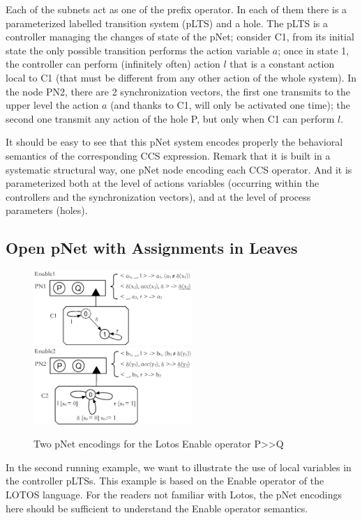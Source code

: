 \documentclass{lncs/llncs}
\begin{document}
  Each of the subnets act as one of the prefix operator.
In each of them there is a parameterized labelled transition system
(pLTS) and a hole. The pLTS is a controller managing the
changes of state of the pNet; consider C1, from its initial state the
only possible transition performs the action variable $a$; once in
state 1, the controller can perform (infinitely often) action $l$ that
is a constant action local to C1 (that must be different from any
other action of the whole system). In the node PN2, there are 2
synchronization vectors, the first one transmits to the upper level the
action $a$ (and thanks to C1, will only be activated one time); the
second one transmit any action of the hole P, but only when C1 can
perform $l$.

It should be easy to see that this pNet system encodes properly the
behavioral semantics of the corresponding CCS expression. Remark
that it is built in a systematic structural way, one pNet node
encoding each CCS operator. And it is parameterized both at the level
of actions variables (occurring within the controllers and the synchronization
vectors), and at the level of process parameters 
(holes). 

\subsection{Open pNet with Assignments in Leaves}
\begin{figure}[h]
  \includegraphics[width=6cm]{XFIG/Enable1.eps}
  \includegraphics[width=6cm]{XFIG/Enable2.eps}
  \caption{Two pNet encodings for the Lotos Enable operator P>>Q }  \label{schema:enable-pnets}
\end{figure}

In the second running example, we want to illustrate the use of local
variables in the controller pLTSs. This example is based on the Enable
operator of the LOTOS language. For the readers not familiar with
Lotos, the pNet encodings here should be sufficient to understand the
Enable operator semantics.
\end{document}
